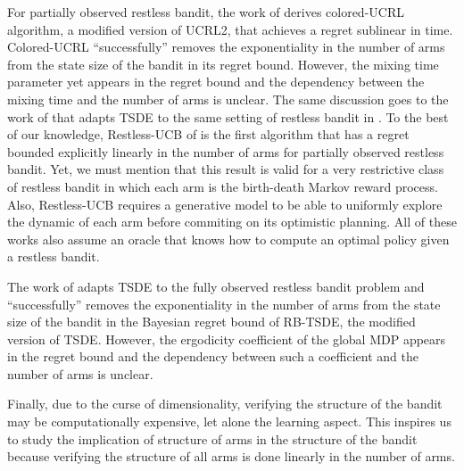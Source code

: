 For partially observed restless bandit, the work of \cite{ortner2012regret} derives colored-UCRL algorithm, a modified version of UCRL2, that achieves a regret sublinear in time.
Colored-UCRL ``successfully'' removes the exponentiality in the number of arms from the state size of the bandit in its regret bound.
However, the mixing time parameter yet appears in the regret bound and the dependency between the mixing time and the number of arms is unclear.
The same discussion goes to the work of \cite{jung2019thompson} that adapts TSDE to the same setting of restless bandit in \cite{ortner2012regret}.
To the best of our knowledge, Restless-UCB of \cite{wang2020restless} is the first algorithm that has a regret bounded explicitly linearly in the number of arms for partially observed restless bandit.
Yet, we must mention that this result is valid for a very restrictive class of restless bandit in which each arm is the birth-death Markov reward process.
Also, Restless-UCB requires a generative model to be able to uniformly explore the dynamic of each arm before commiting on its optimistic planning.
All of these works also assume an oracle that knows how to compute an optimal policy given a restless bandit.

The work of \cite{akbarzadeh2022learning} adapts TSDE to the fully observed restless bandit problem and ``successfully'' removes the exponentiality in the number of arms from the state size of the bandit in the Bayesian regret bound of RB-TSDE, the modified version of TSDE.
However, the ergodicity coefficient of the global MDP appears in the regret bound and the dependency between such a coefficient and the number of arms is unclear.

Finally, due to the curse of dimensionality, verifying the structure of the bandit may be computationally expensive, let alone the learning aspect.
This inspires us to study the implication of structure of arms in the structure of the bandit because verifying the structure of all arms is done linearly in the number of arms.




